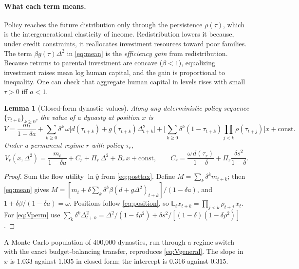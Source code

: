 \documentclass[11pt]{article}
\newtheorem{lemma}{Lemma}
\theoremstyle{remark}
\newcommand{\E}{\mathbb{E}}
\begin{document}
\paragraph{What each term means.}  Policy reaches the future distribution only through the persistence $\rho(\tau)$, which is the intergenerational elasticity of income.  Redistribution lowers it because, under credit constraints, it reallocates investment resources toward poor families.  The term $\beta g(\tau)\Delta^2$ in \eqref{eq:mean} is the \emph{efficiency gain} from redistribution.  Because returns to parental investment are concave ($\beta<1$), equalizing investment raises mean log human capital, and the gain is proportional to inequality.  One can check that aggregate human capital in levels rises with small $\tau>0$ iff $a<1$.

\begin{lemma}[Closed-form dynastic values]\label{lem:values}
Along any deterministic policy sequence $\{\tau_{t+k}\}_{k\ge0}$, the value of a dynasty at position $x$ is
\begin{equation}
V=\frac{m_t}{1-\delta a}+\sum_{k\ge0}\delta^k\,\omega\big[d(\tau_{t+k})+g(\tau_{t+k})\Delta^2_{t+k}\big]
+\Big[\sum_{k\ge0}\delta^k(1-\tau_{t+k})\prod_{j<k}\rho(\tau_{t+j})\Big]x+\text{const}.
\label{eq:Vgeneral}
\end{equation}
Under a permanent regime $r$ with policy $\tau_r$,
\begin{equation}
V_r(x,\Delta^2)=\frac{m_t}{1-\delta a}+C_r+\Pi_r\,\Delta^2+B_r\,x+\text{const},\qquad
C_r=\frac{\omega\,d(\tau_r)}{1-\delta}+\Pi_r\frac{\delta s^2}{1-\delta}.
\label{eq:Vperm}
\end{equation}
\end{lemma}

\begin{proof}
Sum the flow utility $\ln\hat y$ from \eqref{eq:posttax}.  Define $M=\sum_k\delta^km_{t+k}$; then \eqref{eq:mean} gives $M=[m_t+\delta\sum_k\delta^k\beta(d+g\Delta^2)_{t+k}]/(1-\delta a)$, and $1+\delta\beta/(1-\delta a)=\omega$.  Positions follow \eqref{eq:position}, so $\E_t x_{t+k}=\prod_{j<k}\rho_{t+j}\,x_t$.  For \eqref{eq:Vperm} use $\sum_k\delta^k\Delta^2_{t+k}=\Delta^2/(1-\delta\rho^2)+\delta s^2/[(1-\delta)(1-\delta\rho^2)]$.
\end{proof}

A Monte Carlo population of 400{,}000 dynasties, run through a regime switch with the exact budget-balancing transfer, reproduces \eqref{eq:Vgeneral}.  The slope in $x$ is $1.033$ against $1.035$ in closed form; the intercept is $0.316$ against $0.315$.
\end{document}
